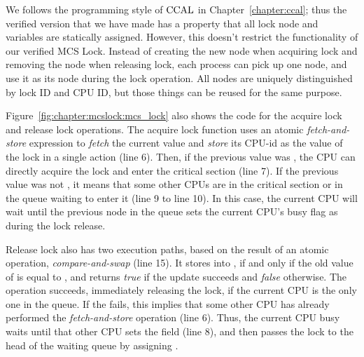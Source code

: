 We follows the programming style of $\mathrm{CCAL}$ in Chapter~\ref{chapter:ccal}; thus
the verified version that we have made has a property that all lock node and variables are statically assigned.
However, this doesn't restrict the functionality of our verified MCS Lock.
Instead of creating the new node when acquiring lock and removing the node when releasing lock,
each process can pick up one node, and use it as its node during the lock operation. 
All nodes are uniquely distinguished by lock ID and CPU ID, but those
things can be reused for the same purpose.

Figure~\ref{fig:chapter:mcslock:mcs_lock} also shows the code for the acquire lock and
release lock operations.  The acquire lock function uses an atomic {\em
fetch-and-store} expression to {\em fetch} the current 
value and {\em store} its CPU-id as the  value of
the lock in a single action (line 6).  Then, if the previous  value
was , the CPU can directly acquire the lock and enter the
critical section (line 7).  If the previous  value was not
, it means that some other CPUs are in the critical
section or in the queue waiting to enter it (line 9 to line 10).  In
this case, the current CPU will wait until the previous node in the
queue sets the current CPU's busy flag as  during the lock
release.

Release lock also has two execution paths, based on the result of an atomic operation, {\em compare-and-swap} (line 15).
It stores  into , if and only if the old value
of  is equal to , and returns {\em
  true} if the update succeeds and {\em false} otherwise.
The  operation succeeds, immediately releasing the lock,
if the current CPU is the only one in the queue.
If the  fails, this implies that some other CPU has
already performed the {\em fetch-and-store} operation (line 6). Thus, the current CPU busy waits until that other CPU sets the
 field  (line 8), and then passes the lock to the head of the
waiting queue by assigning .

